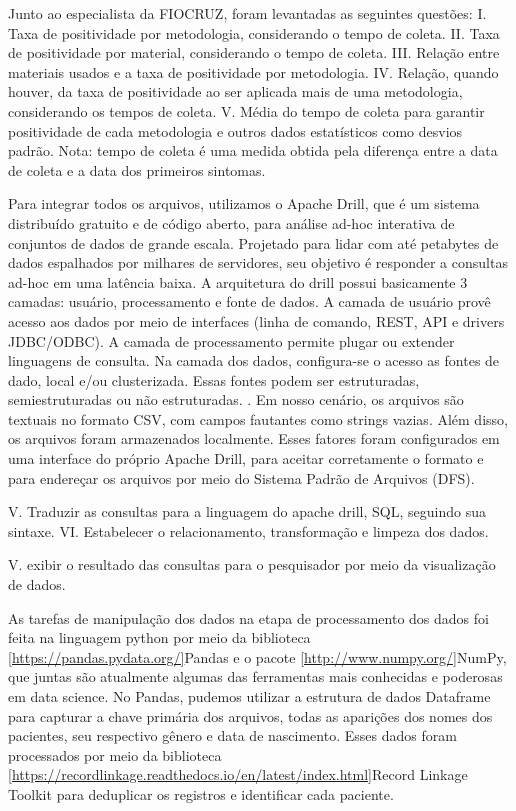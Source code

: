 Junto ao especialista da FIOCRUZ, foram levantadas as seguintes questões:
I.	Taxa de positividade por metodologia, considerando o tempo de coleta.
II.	Taxa de positividade por material, considerando o tempo de coleta.
III.	Relação entre materiais usados e a taxa de positividade por metodologia.
IV.	Relação, quando houver, da taxa de positividade ao ser aplicada mais de uma metodologia, considerando os tempos de coleta.
V.	Média do tempo de coleta para garantir positividade de cada metodologia e outros dados estatísticos como desvios padrão.
Nota: tempo de coleta é uma medida obtida pela diferença entre a data de coleta e a data dos primeiros sintomas.

Para integrar todos os arquivos, utilizamos o Apache Drill, que é um sistema distribuído gratuito e de código aberto, para análise ad-hoc interativa de conjuntos de dados de grande escala. Projetado para lidar com até
petabytes de dados espalhados por milhares de servidores, seu objetivo é responder a consultas ad-hoc em uma latência baixa.
A arquitetura do drill possui basicamente 3 camadas: usuário, processamento e fonte de dados.
A camada de usuário provê acesso aos dados por meio de interfaces (linha de comando, REST, API e drivers JDBC/ODBC). A camada de processamento permite plugar ou extender linguagens de consulta. Na camada dos dados, configura-se  o acesso as fontes de dado, local e/ou clusterizada. Essas fontes podem ser estruturadas, semiestruturadas ou não estruturadas. \cite{hausenblas2013apache}.
Em nosso cenário, os arquivos são textuais no formato CSV, com campos fautantes como strings vazias. Além disso, os arquivos foram armazenados localmente. Esses fatores foram configurados em uma interface do próprio Apache Drill, para aceitar corretamente o formato e para endereçar os arquivos por meio do Sistema Padrão de Arquivos (DFS).

V.	Traduzir as consultas para a linguagem do apache drill, SQL, seguindo sua sintaxe.
VI.	Estabelecer o relacionamento, transformação e limpeza dos dados. 


V.	exibir o resultado das consultas para o pesquisador por meio da visualização de dados.

As tarefas de manipulação dos dados na etapa de processamento dos dados foi feita na linguagem python por meio da biblioteca \ref{https://pandas.pydata.org/}{Pandas} e o pacote \ref{http://www.numpy.org/}{NumPy}, que juntas são atualmente algumas das ferramentas mais conhecidas e poderosas em data science.
No Pandas, pudemos utilizar a estrutura de dados Dataframe para capturar a chave primária dos arquivos, todas as aparições dos nomes dos pacientes, seu respectivo gênero e data de nascimento. Esses dados foram processados por meio da biblioteca \ref{https://recordlinkage.readthedocs.io/en/latest/index.html}{Record Linkage Toolkit} para deduplicar os registros e identificar cada paciente.

